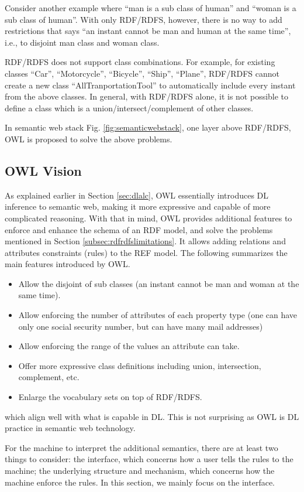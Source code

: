Consider another example where ``man is a sub class of human'' and ``woman is a sub class of human''. With only RDF/RDFS, however, there is no way to add restrictions that says ``an instant cannot be man and human at the same time'', i.e., to disjoint man class and woman class.

RDF/RDFS does not support class combinations. For example, for existing classes ``Car'', ``Motorcycle'', ``Bicycle'', ``Ship'', ``Plane'', RDF/RDFS cannot create a new class ``AllTranportationTool'' to automatically include every instant from the above classes. In general, with RDF/RDFS alone, it is not possible to define a class which is a union/intersect/complement of other classes.

In semantic web stack Fig. \ref{fig:semanticwebstack}, one layer above RDF/RDFS, OWL is proposed to solve the above problems.

\subsection{OWL Vision}

As explained earlier in Section \ref{sec:dlalc}, OWL essentially introduces DL inference to semantic web, making it more expressive and capable of more complicated reasoning. With that in mind, OWL provides additional features to enforce and enhance the schema of an RDF model, and solve the problems mentioned in Section \ref{subsec:rdfrdfslimitations}. It allows adding relations and attributes constraints (rules) to the REF model. The following summarizes the main features introduced by OWL.
\begin{itemize}
	\item Allow the disjoint of sub classes (an instant cannot be man and woman at the same time).
	\item Allow enforcing the number of attributes of each property type (one can have only one social security number, but can have many mail addresses)
	\item Allow enforcing the range of the values an attribute can take.
	\item Offer more expressive class definitions including union, intersection, complement, etc.
	\item Enlarge the vocabulary sets on top of RDF/RDFS.
\end{itemize}
which align well with what is capable in DL. This is not surprising as OWL is DL practice in semantic web technology.

For the machine to interpret the additional semantics, there are at least two things to consider: the interface, which concerns how a user tells the rules to the machine; the underlying structure and mechanism, which concerns how the machine enforce the rules. In this section, we mainly focus on the interface.

